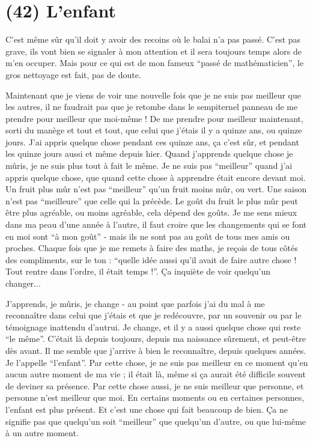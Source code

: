 \section{(42) L'enfant}

C'est même sûr qu'il doit y avoir des recoins où le balai n'a pas passé. C'est pas grave, ils vont bien se signaler à mon attention et il sera toujours temps alors de m'en occuper. Mais pour ce qui est de mon fameux ``passé de mathématicien'', le gros nettoyage est fait, pas de doute.

Maintenant que je viens de voir une nouvelle fois que je ne suis pas meilleur que les autres, il ne faudrait pas que je retombe dans le sempiternel panneau de me prendre pour meilleur que moi-même ! De me prendre pour meilleur maintenant, sorti du manège et tout et tout, que celui que j'étais il y a quinze ans, ou quinze jours. J'ai appris quelque chose pendant ces quinze ans, ça c'est sûr, et pendant les quinze jours aussi et même depuis hier. Quand j'apprends quelque chose je mûris, je ne suis plus tout à fait le même. Je ne suis pas ``meilleur'' quand j'ai appris quelque chose, que quand cette chose à apprendre était encore devant moi. Un fruit plus mûr n'est pas ``meilleur'' qu'un fruit moins mûr, ou vert. Une saison n'est pas ``meilleure'' que celle qui la précède. Le goût du fruit le plus mûr peut être plus agréable, ou moins agréable, cela dépend des goûts. Je me sens mieux dans ma peau d'une année à l'autre, il faut croire que les changements qui se font en moi sont ``à mon goût'' - mais ils ne sont pas au goût de tous mes amis ou proches. Chaque fois que je me remets à faire des maths, je reçois de tous côtés des compliments, sur le ton : ``quelle idée aussi qu'il avait de faire autre chose ! Tout rentre dans l'ordre, il était temps !''. Ça inquiète de voir quelqu'un changer...

J'apprends, je mûris, je change - au point que parfois j'ai du mal à me reconnaître dans celui que j'étais et que je redécouvre, par un souvenir ou par le témoignage inattendu d'autrui. Je change, et il y a aussi quelque chose qui reste ``le même''. C'était là depuis toujours, depuis ma naissance sûrement, et peut-être dès avant. Il me semble que j'arrive à bien le reconnaître, depuis quelques années. Je l'appelle ``l'enfant''. Par cette chose, je ne suis pas meilleur en ce moment qu'en aucun autre moment de ma vie ; il était là, même si ça aurait été difficile souvent de deviner sa présence. Par cette chose aussi, je ne suis meilleur que personne, et personne n'est meilleur que moi. En certains moments ou en certaines personnes, l'enfant est plus présent. Et c'est une chose qui fait beaucoup de bien. Ça ne signifie pas que quelqu'un soit ``meilleur'' que quelqu'un d'autre, ou que lui-même à un autre moment.

